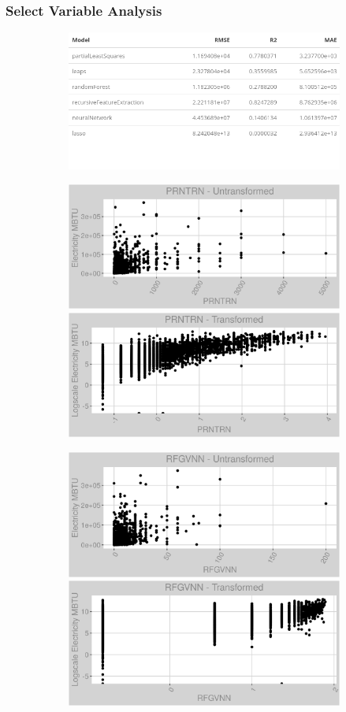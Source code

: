 \subsubsection{Select Variable Analysis}
\label{appendix:electricity:sva}
\begin{figure}[h]
\centering
\begin{subfigure}{0.8\textwidth}
\centering
\includegraphics[width=.99\textwidth, height=0.25\textheight]{Images/electricity_fe_summary.png}
\end{subfigure}
\begin{subfigure}{1\textwidth}
\centering
\includegraphics[width=.49\textwidth, height=0.25\textheight]{Images/electricity_var_original_0.png}
\includegraphics[width=.49\textwidth, height=0.25\textheight]{Images/electricity_var_transformed_0.png}
\end{subfigure}
\begin{subfigure}{1\textwidth}
\centering
\includegraphics[width=.49\textwidth, height=0.25\textheight]{Images/electricity_var_original_1.png}
\includegraphics[width=.49\textwidth, height=0.25\textheight]{Images/electricity_var_transformed_1.png}
\end{subfigure}
\end{figure}
